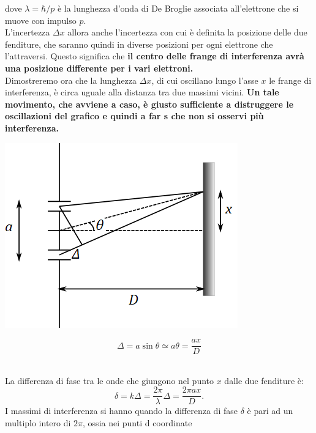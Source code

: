 dove $\lambda = \hbar / p$ è la lunghezza d'onda di De Broglie associata all'elettrone che si muove con impulso $p$.\\
L'incertezza $\Delta x$ allora anche l'incertezza con cui è definita la posizione delle due fenditure, che saranno quindi in diverse posizioni per ogni elettrone che l'attraversi. Questo significa che \textbf{il centro delle frange di interferenza avrà una posizione differente per i vari elettroni.}\\
Dimostreremo ora che la lunghezza $\Delta x$, di cui oscillano lungo l'asse $x$ le frange di interferenza, è circa uguale alla distanza tra due massimi vicini. \textbf{Un tale movimento, che avviene a caso, è giusto sufficiente a distruggere le oscillazioni del grafico e quindi a far s che non si osservi più interferenza.}\\
\vspace{1cm}
\begin{minipage}{.5\textwidth}
\includegraphics[width=.8\textwidth]{immagini/cap_2/fig_2_7.png}	
\end{minipage}
\begin{minipage}{.5\textwidth}
\begin{equation}
\Delta = a \sin \theta \simeq a \theta = \frac{ax}{D}
\end{equation}
\end{minipage}\\
\vspace{.5cm}
La differenza di fase tra le onde che giungono nel punto $x$ dalle due fenditure è:
\begin{equation}
\delta = k\Delta =\frac{2 \pi }{\lambda}\Delta = \frac{2 \pi a x}{D}.
\end{equation}
I massimi di interferenza si hanno quando la differenza di fase $\delta $ è pari ad un multiplo intero di $2 \pi$, ossia nei punti d coordinate
